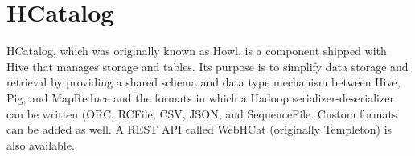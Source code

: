 \section{HCatalog}
HCatalog, which was originally known as Howl, is a component shipped
with Hive that manages storage and tables. Its purpose is to simplify
data storage and retrieval by providing a shared schema and data type
mechanism between Hive, Pig, and MapReduce and the formats in which a
Hadoop serializer-deserializer can be written (ORC, RCFile, CSV, JSON,
and SequenceFile. Custom formats can be added as well. A REST API
called WebHCat (originally Templeton) is also
available\cite{hid-sp18-419-www-hc-wiki}.
